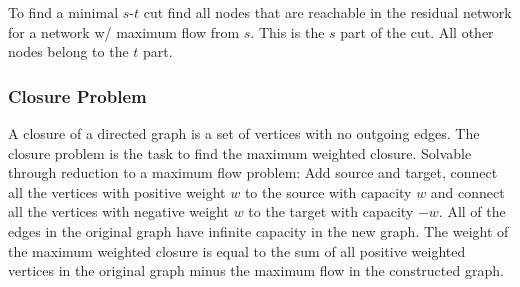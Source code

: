 To find a minimal $s$-$t$ cut find all nodes that are reachable in the
residual network for a network w/ maximum flow from $s$.  This is the
$s$ part of the cut.  All other nodes belong to the $t$ part.

\subsubsection{Closure Problem}

A closure of a directed graph is a set of vertices with no outgoing
edges.  The closure problem is the task to find the maximum weighted
closure.  Solvable through reduction to a maximum flow problem: Add
source and target, connect all the vertices with positive weight $w$
to the source with capacity $w$ and connect all the vertices with
negative weight $w$ to the target with capacity $-w$.  All of the
edges in the original graph have infinite capacity in the new
graph.  The weight of the maximum weighted closure is equal to the sum
of all positive weighted vertices in the original graph minus the
maximum flow in the constructed graph.

